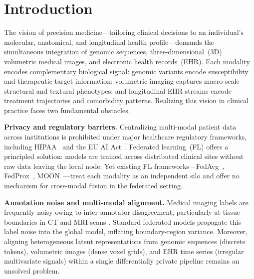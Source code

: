 \documentclass[a4paper,fleqn]{cas-dc}
\begin{document}
\maketitle

\section{Introduction}
\label{sec:intro}

The vision of precision medicine---tailoring clinical decisions to an individual's molecular, anatomical, and longitudinal health profile---demands the simultaneous integration of genomic sequences, three-dimensional~(3D) volumetric medical images, and electronic health records~(EHR). Each modality encodes complementary biological signal: genomic variants encode susceptibility and therapeutic target information; volumetric imaging captures macro-scale structural and textural phenotypes; and longitudinal EHR streams encode  treatment trajectories and comorbidity patterns. Realizing this vision in clinical practice faces two fundamental obstacles.

\textbf{Privacy and regulatory barriers.} Centralizing multi-modal patient data across institutions is prohibited under major healthcare regulatory frameworks, including HIPAA~\citep{hipaa_guidance_2024} and the EU AI
Act~\citep{eu_ai_act_2024}. Federated learning~(FL) offers a principled solution: models are trained across distributed clinical sites without raw data leaving the local node. Yet existing FL frameworks---FedAvg~\citep{mcmahan2017}, FedProx~\citep{li2020fedprox}, MOON~\citep{li2021moon}---treat each modality as an independent silo and offer no mechanism for cross-modal fusion in the federated setting.

\textbf{Annotation noise and multi-modal alignment.} Medical imaging labels are frequently noisy owing to inter-annotator disagreement, particularly at tissue boundaries in CT and MRI scans \citep{rue_ct_2025}. Standard federated models propagate this label noise into the global model, inflating boundary-region variance. Moreover, aligning heterogeneous latent representations from
genomic sequences (discrete tokens), volumetric images (dense voxel grids), and EHR time series (irregular multivariate signals) within a single differentially private pipeline remains an unsolved problem.
\end{document}

